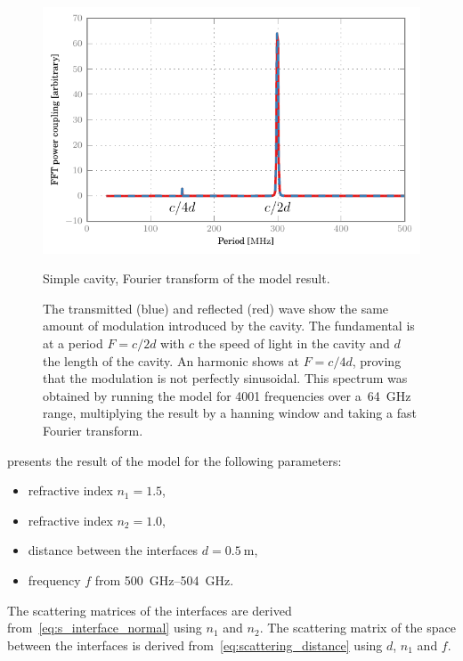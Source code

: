 \begin{figure}[hbtp]
    \centering
    \includegraphics{simple_cavity_fft}
    \caption{Simple cavity, Fourier transform of the model result.}
    \caption*{
        The transmitted (blue) and reflected (red) wave show the same amount of modulation
        introduced by the cavity.
        The fundamental is at a period $F=c/2d$ with $c$ the speed of light in the cavity
        and $d$ the length of the cavity.
        An harmonic shows at $F=c/4d$,
        proving that the modulation is not perfectly sinusoidal.
        This spectrum was obtained by running the model for 4001 frequencies
        over a~\SI{64}{\giga\hertz} range,
        multiplying the result by a hanning window and taking a fast Fourier transform.
    }
    \label{fig:simple_cavity_fft}
\end{figure}

 presents the result of the model for the following parameters:
\begin{itemize}
    \item refractive index $n_1=1.5$,
    \item refractive index $n_2=1.0$,
    \item distance between the interfaces $d=\SI{0.5}{\meter}$,
    \item frequency $f$ from \SIrange{500}{504}{\giga\hertz}.
\end{itemize}
The scattering matrices of the interfaces are derived from~\vref{eq:s_interface_normal} using $n_1$ and $n_2$.
The scattering matrix of the space between the interfaces is derived from~\vref{eq:scattering_distance} using $d$, $n_1$ and $f$.



